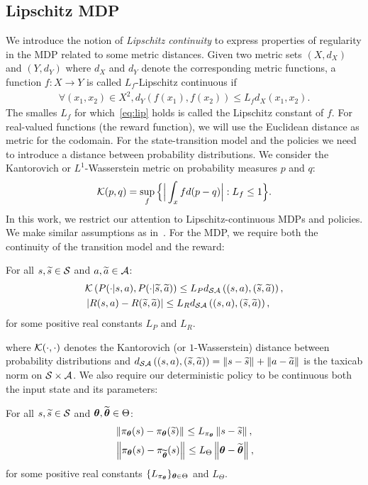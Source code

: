 \subsection{Lipschitz MDP}
We introduce the notion of \emph{Lipschitz continuity} to express properties of regularity in the \ac{MDP} related to some metric distances. Given two metric sets $(X, d_X)$ and $(Y, d_Y)$ where $d_X$ and $d_Y$ denote the corresponding metric functions, a function $f: X \rightarrow Y$ is called $L_f$-Lipschitz continuous if
\begin{align} \forall(x_1, x_2) \in X^2, d_Y(f(x_1), f(x_2)) \leq L_f d_X(x_1, x_2). \label{eq:lip} \end{align}
The smalles $L_f$ for which~\eqref{eq:lip} holds is called the Lipschitz constant of $f$. For real-valued functions (\eg the reward function), we will use the Euclidean distance as metric for the codomain. For the state-transition model and the policies we need to introduce a distance between probability distributions. We consider the Kantorovich or $L^1$-Wasserstein metric on probability measures $p$ and $q$:
$$ \mathcal{K}(p, q) = \sup_f\Big\{ \Big| \int_x f d(p-q) \Big|: L_f \leq 1 \Big\}.$$
In this work, we restrict our attention to Lipschitz-continuous MDPs and policies. We make similar assumptions as in~\citep{pirotta2015policy}. For the MDP, we require both the continuity of the transition model and the reward:
%
\begin{assumption}\label{ass:lipmdp}
	For all $s,\widetilde{s}\in\mathcal{S}$ and $a,\widetilde{a}\in\mathcal{A}$:
	\begin{align}
	&\mathcal{K}\left(P(\cdot|s,a), P(\cdot| \widetilde{s},\widetilde{a})\right) \leq L_{P}d_{\mathcal{S}\mathcal{A}}\left((s,a),(\widetilde{s},\widetilde{a})\right), \\
	&\left|R(s,a) - R(\widetilde{s},\widetilde{a})\right| \leq L_{R}d_{\mathcal{S}\mathcal{A}}\left((s,a),(\widetilde{s},\widetilde{a})\right),
	\end{align}
	for some positive real constants $L_{P}$ and $L_{R}$.
\end{assumption}
%
where $\mathcal{K}(\cdot,\cdot)$ denotes the Kantorovich (or $1$-Wasserstein) distance between probability distributions and $d_{\mathcal{S}\mathcal{A}}\left((s,a),(\widetilde{s},\widetilde{a})\right) = \left\|s-\widetilde{s}\right\|_{} + \left\|a-\widetilde{a}\right\|_{}$ is the taxicab norm on $\mathcal{S}\times\mathcal{A}$.
We also require our deterministic policy to be continuous both \wrt the input state and its parameters:
%
\begin{assumption}\label{ass:lippol}
	For all $s,\widetilde{s}\in\mathcal{S}$ and $\boldsymbol{\theta},\widetilde{\boldsymbol{\theta}}\in\Theta$:
	\begin{align}
	&\left\|\pi_{\boldsymbol{\theta}}(s) - \pi_{\boldsymbol{\theta}}(\widetilde{s})\right\|_{} \leq L_{\pi_{\boldsymbol{\theta}}}\left\|s-\widetilde{s}\right\|_{}, \\
	&\left\|\pi_{\boldsymbol{\theta}}(s) - \pi_{\widetilde{\boldsymbol{\theta}}}(s)\right\|_{} \leq L_{\Theta}\left\|\boldsymbol{\theta}-\widetilde{\boldsymbol{\theta}}\right\|_{},
	\end{align}
	for some positive real constants $\{L_{\pi_{\boldsymbol{\theta}}}\}_{\boldsymbol{\theta}\in\Theta}$ and $L_{\Theta}$.
\end{assumption}
